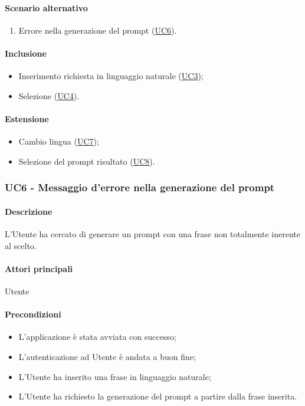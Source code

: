 \paragraph*{Scenario alternativo}
\begin{enumerate}
  \item Errore nella generazione del prompt (\hyperref[UC6]{UC6}).
\end{enumerate}

\paragraph*{Inclusione}
\begin{itemize}
  \item Inserimento richiesta in linguaggio naturale (\hyperref[UC3]{UC3});
  \item Selezione  (\hyperref[UC4]{UC4}).
\end{itemize}

\paragraph*{Estensione}
\begin{itemize}
  \item Cambio lingua (\hyperref[UC7]{UC7});
  \item Selezione del prompt risultato (\hyperref[UC8]{UC8}).
\end{itemize}


\subsubsection{UC6 - Messaggio d'errore nella generazione del prompt}\label{UC6}

\paragraph*{Descrizione}
L’Utente ha cercato di generare un prompt con una frase non totalmente inerente al  scelto.

\paragraph*{Attori principali} Utente

\paragraph*{Precondizioni}
\begin{itemize}
  \item L'applicazione è stata avviata con successo;
  \item L’autenticazione ad Utente è andata a buon fine;
  \item L’Utente ha inserito una frase in linguaggio naturale;
  \item L’Utente ha richiesto la generazione del prompt a partire dalla frase inserita.  
\end{itemize}


